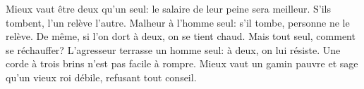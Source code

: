 Mieux vaut être deux qu’un seul: le salaire de leur peine sera meilleur.
S’ils tombent, l’un relève l’autre.
	Malheur à l’homme seul: s’il tombe, personne ne le relève.
De même, si l’on dort à deux, on se tient chaud.
	Mais tout seul, comment se réchauffer?
L’agresseur terrasse un homme seul: à deux, on lui résiste.
	Une corde à trois brins n’est pas facile à rompre.
Mieux vaut un gamin pauvre et sage
	qu’un vieux roi débile, refusant tout conseil.

